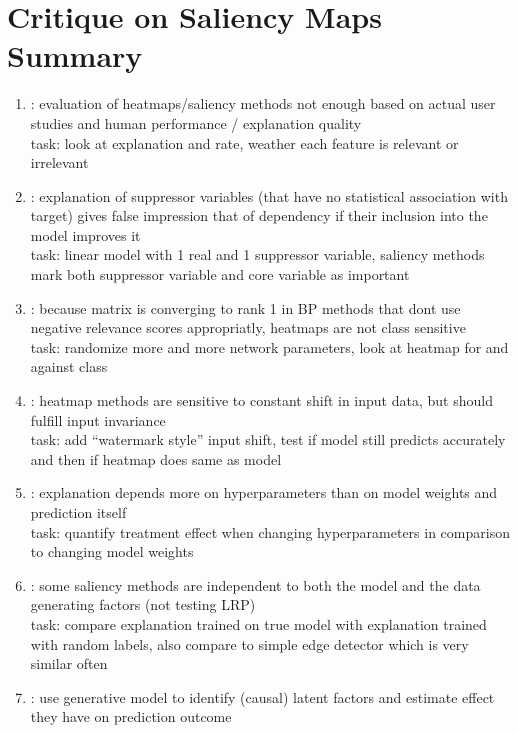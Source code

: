 \section{Critique on Saliency Maps Summary}
\begin{enumerate}
      \item \cite{Sixt2022a}: evaluation of heatmaps/saliency methods not enough based on actual user studies and human performance / explanation quality
            \\ task: look at explanation and rate, weather each feature is relevant or irrelevant
      \item \cite{Wilming2023}: explanation of suppressor variables (that have no statistical association with target) gives false impression that of dependency if their inclusion into the model improves it
            \\ task: linear model with 1 real and 1 suppressor variable, saliency methods mark both suppressor variable and core variable as important
      \item \cite{Sixt2020}: because matrix is converging to rank 1 in BP methods that dont use negative relevance scores appropriatly, heatmaps are not class sensitive
            \\ task: randomize more and more network parameters, look at heatmap for and against class
      \item \cite{Kindermans2019}: heatmap methods are sensitive to constant shift in input data, but should fulfill input invariance
            \\ task: add “watermark style” input shift, test if model still predicts accurately and then if heatmap does same as model
      \item \cite{Karimi2023}: explanation depends more on hyperparameters than on model weights and prediction itself
            \\ task: quantify treatment effect when changing hyperparameters in comparison to changing model weights
      \item \cite{Adebayo2018}: some saliency methods are independent to both the model and the data generating factors (not testing LRP)
            \\ task: compare explanation trained on true model with explanation trained with random labels, also compare to simple edge detector which is very similar often
      \item \cite{Parafita2019}: use generative model to identify (causal) latent factors and estimate effect they have on prediction outcome

\end{enumerate}
